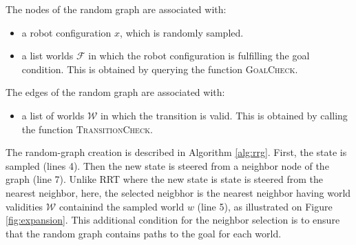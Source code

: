\documentclass[letterpaper, 10 pt, conference]{ieeeconf}  %
\begin{document}
The nodes of the random graph are associated with:
\begin{itemize}
\item a robot configuration $x$, which is randomly sampled.
\item a list worlds $\mathcal{F}$ in which the robot configuration is fulfilling the goal condition. This is obtained by querying the function \textsc{GoalCheck}. 
\end{itemize} 

The edges of the random graph are associated with:
\begin{itemize}
\item a list of worlds $\mathcal{W}$ in which the transition is valid. This is obtained by calling the function \textsc{TransitionCheck}.
\end{itemize}



The random-graph creation is described in Algorithm \ref{alg:rrg}. First, the state is sampled (lines 4). Then the new state is steered from a neighbor node of the graph (line 7). Unlike RRT where the new state is state is steered from the nearest neighbor, here, the selected neigbhor is the nearest neighbor having world validities $\mathcal{W}$ containind the sampled world $w$ (line 5), as illustrated on Figure \ref{fig:expansion}. This additional condition for the neighbor selection is to ensure that the random graph contains paths to the goal for each world.
 

\end{document}
